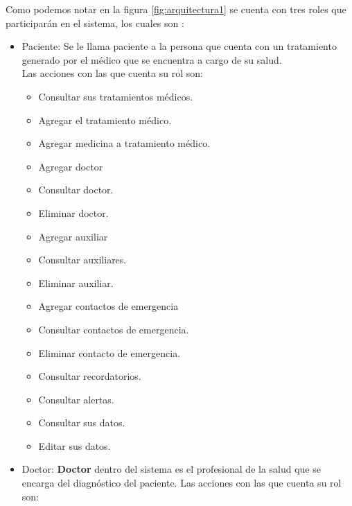 Como podemos notar en la figura \ref{fig:arquitectura1} se cuenta con tres roles que participarán en el sistema, los cuales son :
\begin{itemize}

	\item Paciente: Se le llama paciente a la persona que cuenta con un tratamiento generado por el médico que se encuentra a cargo de su salud.\\
	
	Las acciones con las que cuenta su rol son:
	\begin{itemize}
		\item Consultar sus tratamientos médicos.
		\item Agregar el tratamiento médico.
		\item Agregar medicina a tratamiento médico.
		\item Agregar doctor
		\item Consultar doctor.
		\item Eliminar doctor.
		\item Agregar auxiliar
		\item Consultar auxiliares.
		\item Eliminar auxiliar.
		\item Agregar contactos de emergencia
		\item Consultar contactos de emergencia.
		\item Eliminar contacto de emergencia.
		\item Consultar recordatorios.
		\item Consultar alertas.
		\item Consultar sus datos.
		\item Editar sus datos.
	\end{itemize}

	\item Doctor: \textbf{Doctor} dentro del sistema es el profesional de la salud que se encarga del diagnóstico del paciente.
	Las acciones con las que cuenta su rol son:
		\begin{itemize}
			

\end{itemize}
\end{itemize}
